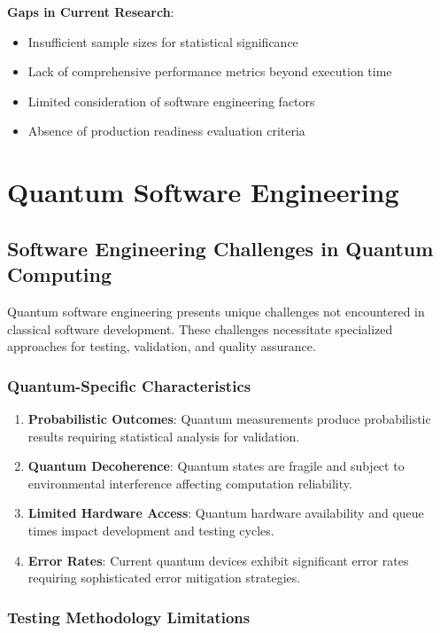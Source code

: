 \documentclass[12pt,a4paper]{report}
\begin{document}
\textbf{Gaps in Current Research}:
\begin{itemize}
\item Insufficient sample sizes for statistical significance
\item Lack of comprehensive performance metrics beyond execution time
\item Limited consideration of software engineering factors
\item Absence of production readiness evaluation criteria
\end{itemize}

\section{Quantum Software Engineering}

\subsection{Software Engineering Challenges in Quantum Computing}

Quantum software engineering presents unique challenges not encountered in classical software development. These challenges necessitate specialized approaches for testing, validation, and quality assurance.

\subsubsection{Quantum-Specific Characteristics}

\begin{enumerate}
\item \textbf{Probabilistic Outcomes}: Quantum measurements produce probabilistic results requiring statistical analysis for validation.

\item \textbf{Quantum Decoherence}: Quantum states are fragile and subject to environmental interference affecting computation reliability.

\item \textbf{Limited Hardware Access}: Quantum hardware availability and queue times impact development and testing cycles.

\item \textbf{Error Rates}: Current quantum devices exhibit significant error rates requiring sophisticated error mitigation strategies.
\end{enumerate}

\subsubsection{Testing Methodology Limitations}
\end{document}
